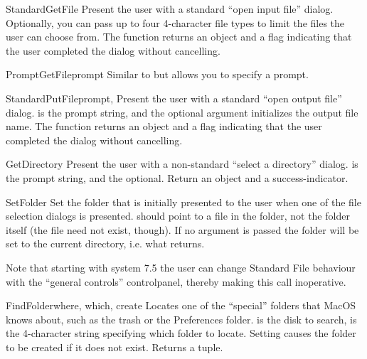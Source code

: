 \begin{funcdesc}{StandardGetFile}{}
Present the user with a standard ``open input file''
dialog. Optionally, you can pass up to four 4-character file types to limit
the files the user can choose from. The function returns an 
object and a flag indicating that the user completed the dialog
without cancelling.
\end{funcdesc}

\begin{funcdesc}{PromptGetFile}{prompt}
Similar to  but allows you to specify a
prompt.
\end{funcdesc}

\begin{funcdesc}{StandardPutFile}{prompt, }
Present the user with a standard ``open output file''
dialog.  is the prompt string, and the optional
 argument initializes the output file name. The function
returns an  object and a flag indicating that the user
completed the dialog without cancelling.
\end{funcdesc}

\begin{funcdesc}{GetDirectory}{}
Present the user with a non-standard ``select a directory''
dialog.  is the prompt string, and the optional.
Return an  object and a success-indicator.
\end{funcdesc}

\begin{funcdesc}{SetFolder}{}
Set the folder that is initially presented to the user when one of
the file selection dialogs is presented.  should point to
a file in the folder, not the folder itself (the file need not exist,
though). If no argument is passed the folder will be set to the
current directory, i.e. what  returns.

Note that starting with system 7.5 the user can change Standard File
behaviour with the ``general controls'' controlpanel, thereby making
this call inoperative.
\end{funcdesc}

\begin{funcdesc}{FindFolder}{where, which, create}
Locates one of the ``special'' folders that MacOS knows about, such as
the trash or the Preferences folder.  is the disk to
search,  is the 4-character string specifying which folder to
locate. Setting  causes the folder to be created if it
does not exist. Returns a  tuple.
\end{funcdesc}

